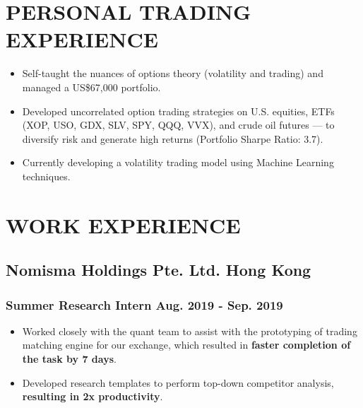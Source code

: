 \documentclass{article}
\begin{document}
\vspace{-7.1mm}

\section{PERSONAL TRADING EXPERIENCE}
\vspace{-2mm}
\begin{itemize}[noitemsep]

\item Self-taught the nuances of options theory (volatility and trading) and managed a US\$67,000 portfolio.
\item Developed uncorrelated option trading strategies on U.S. equities, ETFs (XOP, USO, GDX, SLV, SPY, QQQ, VVX), and crude oil futures — to diversify risk and generate high returns (Portfolio Sharpe Ratio: 3.7).
\item Currently developing a volatility trading model using Machine Learning techniques.
\end{itemize}

\vspace{-7.1mm}


\section{WORK EXPERIENCE}
\vspace{-1.5mm}
\subsection{Nomisma Holdings Pte. Ltd. \hspace{4.1in} Hong Kong}
\subsubsection{Summer Research Intern \hspace{4.5in} Aug. 2019 - Sep. 2019}
\vspace{-2.9mm}
\begin{itemize}[noitemsep]
\item Worked closely with the quant team to assist with the prototyping of trading matching engine for our exchange, which
resulted in \textbf{faster completion of the task by 7 days}.
\item Developed research templates to perform top-down competitor analysis, \textbf{resulting in 2x productivity}.
\end{itemize}
\end{document}
